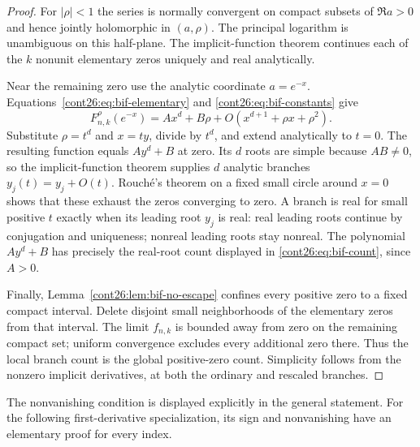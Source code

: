 \begin{proof}
For $|\rho|<1$ the series is normally convergent on compact subsets
of $\Re a>0$ and hence jointly holomorphic in $(a,\rho)$. The principal
logarithm is unambiguous on this half-plane. The implicit-function
theorem continues each of the $k$ nonunit elementary zeros uniquely
and real analytically.

Near the remaining zero use the analytic coordinate $a=e^{-x}$.
Equations~\eqref{cont26:eq:bif-elementary} and \eqref{cont26:eq:bif-constants} give
\begin{equation}\label{cont26:eq:bif-local}
 F_{n,k}^{\rho}(e^{-x})
       =A x^d+B\rho+O(x^{d+1}+\rho x+\rho^2).
\end{equation}
Substitute $\rho=t^d$ and $x=ty$, divide by $t^d$, and extend
analytically to $t=0$. The resulting function equals $Ay^d+B$ at zero.
Its $d$ roots are simple because $AB\ne0$, so the implicit-function
theorem supplies $d$ analytic branches $y_j(t)=y_j+O(t)$. Rouch\'e's
theorem on a fixed small circle around $x=0$ shows that these exhaust
the zeros converging to zero. A branch is real for small positive $t$
exactly when its leading root $y_j$ is real: real leading roots continue
by conjugation and uniqueness; nonreal leading roots stay nonreal.
The polynomial $Ay^d+B$ has precisely the real-root count displayed
in \eqref{cont26:eq:bif-count}, since $A>0$.

Finally, Lemma~\ref{cont26:lem:bif-no-escape} confines every positive zero to
a fixed compact interval. Delete disjoint small neighborhoods of the
elementary zeros from that interval. The limit $f_{n,k}$ is bounded
away from zero on the remaining compact set; uniform convergence
excludes every additional zero there. Thus the local branch count is
the global positive-zero count. Simplicity follows from the nonzero
implicit derivatives, at both the ordinary and rescaled branches.
\end{proof}

The nonvanishing condition is displayed explicitly in the general
statement. For the following first-derivative specialization, its sign
and nonvanishing have an elementary proof for every index.

